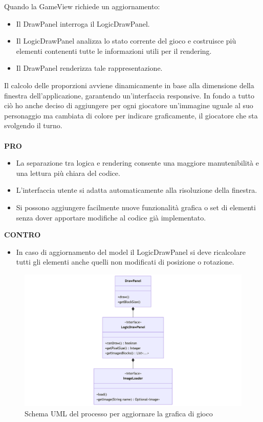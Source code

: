 \documentclass[a4paper,12pt]{report}
\begin{document}
Quando la GameView richiede un aggiornamento:
\begin{itemize}
	\item Il DrawPanel interroga il LogicDrawPanel.
	\item Il LogicDrawPanel analizza lo stato corrente del gioco e costruisce più elementi contenenti tutte le informazioni utili per il rendering.
	\item Il DrawPanel renderizza tale rappresentazione.
\end{itemize}
Il calcolo delle proporzioni avviene dinamicamente in base alla dimensione della finestra dell’applicazione, garantendo un’interfaccia responsive. 
In fondo a tutto ciò ho anche deciso di aggiungere per ogni giocatore un'immagine uguale al suo personaggio ma cambiata di colore per indicare graficamente, 
il giocatore che sta svolgendo il turno.
\\
\\
\textbf{PRO}
\begin{itemize}
	\item La separazione tra logica e rendering consente una maggiore manutenibilità e una lettura più chiara del codice.
	\item L'interfaccia utente si adatta automaticamente alla risoluzione della finestra.
	\item Si possono aggiungere facilmente nuove funzionalità grafica o set di elementi senza dover apportare modifiche al codice già implementato.
\end{itemize}
\textbf{CONTRO}
\begin{itemize}
	\item In caso di aggiornamento del model il LogicDrawPanel si deve ricalcolare tutti gli elementi anche quelli non modificati di posizione o rotazione.
\end{itemize}
\begin{figure}[H]
	\centering{}
	\includegraphics[width=14cm]{img/DisegnareGrafica.png}
	\caption{Schema UML del processo per aggiornare la grafica di gioco}
	\label{img:Aggiornamento Grafica}
\end{figure}
\end{document}
